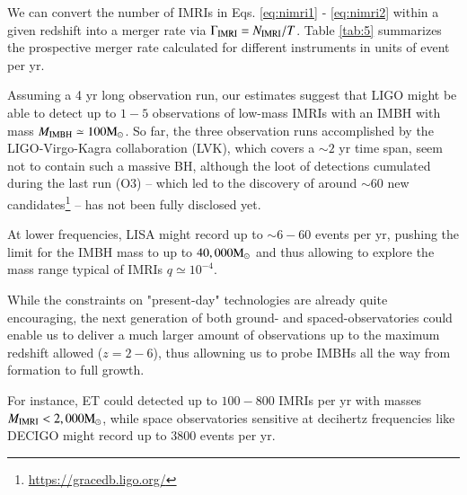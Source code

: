 \documentclass[article]{aa}
\newcommand{\Ms}{{\rm M}_\odot}
\newcommand{\ibh}{{\rm IMBH}}
\newcommand{\imri}{{\rm IMRI}}
\begin{document}
We can convert the number of IMRIs in Eqs. \ref{eq:nimri1} - \ref{eq:nimri2} within a given redshift into a merger rate via $\Gamma_\imri = N_\imri / T$. Table \ref{tab:5} summarizes the prospective merger rate calculated for different instruments in units of event per yr.

Assuming a 4 yr long observation run, our estimates suggest that LIGO might be able to detect up to $1-5$ observations of low-mass IMRIs with an IMBH with mass $M_\ibh \simeq 100\Ms$. So far, the three observation runs accomplished by the LIGO-Virgo-Kagra collaboration (LVK), which covers a $\sim 2$ yr time span, seem not to contain such a massive BH, although the loot of detections cumulated during the last run (O3) -- which led to the discovery of around $\sim 60$ new candidates\footnote{\url{https://gracedb.ligo.org/}} -- has not been fully disclosed yet.

At lower frequencies, LISA might record up to $\sim 6-60$ events per yr, pushing the limit for the IMBH mass to up to $40,000\Ms$ and thus allowing to explore the mass range typical of IMRIs $q \simeq 10^{-4}$. 

While the constraints on "present-day" technologies are already quite encouraging, the next generation of both ground- and spaced-observatories could enable us to deliver a much larger amount of observations up to the maximum redshift allowed ($z=2-6$), thus allowning us to probe IMBHs all the way from formation to full growth.

For instance, ET could detected up to $100-800$ IMRIs per yr with masses $M_\imri < 2,000 \Ms$, while space observatories sensitive at decihertz frequencies like DECIGO might record up to $3800$ events per yr.
\end{document}
